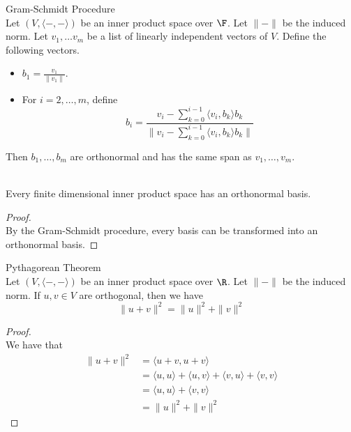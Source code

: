 \documentclass[a4paper]{article}
\begin{document}
\begin{thm}{Gram-Schmidt Procedure}{}\\
Let $(V,\langle-,-\rangle)$ be an inner product space over $\F$. Let $\|-\|$ be the induced norm. Let $v_1,\dots v_m$ be a list of linearly independent vectors of $V$. Define the following vectors. 
\begin{itemize}
\item $b_1=\frac{v_1}{\|v_1\|}$. 
\item For $i=2,\dots,m$, define $$b_i=\frac{v_i-\sum_{k=0}^{i-1}\langle v_i,b_k\rangle b_k}{\|v_i-\sum_{k=0}^{i-1}\langle v_i,b_k\rangle b_k\|}$$
\end{itemize}
Then $b_1,\dots,b_m$ are orthonormal and has the same span as $v_1,\dots,v_m$. 
\end{thm}

\begin{crl}{}{}\\
Every finite dimensional inner product space has an orthonormal basis. 
\begin{proof}\\
By the Gram-Schmidt procedure, every basis can be transformed into an orthonormal basis. 
\end{proof}
\end{crl}

\begin{thm}{Pythagorean Theorem}{}\\
Let $(V,\langle-,-\rangle)$ be an inner product space over $\R$. Let $\|-\|$ be the induced norm. If $u,v\in V$ are orthogonal, then we have $$\|u+v\|^2=\|u\|^2+\|v\|^2$$ 
\begin{proof}\\
We have that 
\begin{align*}
\|u+v\|^2&=\langle u+v,u+v\rangle\\
&=\langle u,u\rangle+\langle u,v\rangle+\langle v,u\rangle+\langle v,v\rangle\\
&=\langle u,u\rangle+\langle v,v\rangle\\
&=\|u\|^2+\|v\|^2
\end{align*}
\end{proof}
\end{thm}
\end{document}
